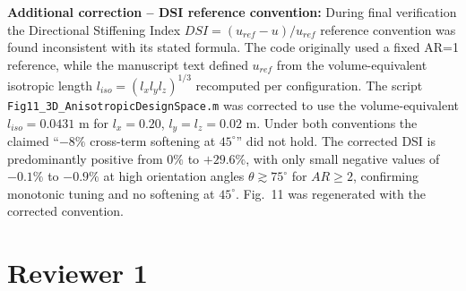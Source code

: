 \documentclass[12pt,a4paper]{article}
\begin{document}
\textbf{Additional correction -- DSI reference convention:} During final verification the Directional Stiffening Index $DSI=(u_{ref}-u)/u_{ref}$ reference convention was found inconsistent with its stated formula. The code originally used a fixed AR=1 reference, while the manuscript text defined $u_{ref}$ from the volume-equivalent isotropic length $l_{iso}=(l_x l_y l_z)^{1/3}$ recomputed per configuration. The script \texttt{Fig11\_3D\_AnisotropicDesignSpace.m} was corrected to use the volume-equivalent $l_{iso}=0.0431$ m for $l_x=0.20$, $l_y=l_z=0.02$ m. Under both conventions the claimed ``$-8\%$ cross-term softening at $45^\circ$'' did not hold. The corrected DSI is predominantly positive from $0\%$ to $+29.6\%$, with only small negative values of $-0.1\%$ to $-0.9\%$ at high orientation angles $\theta\gtrsim75^\circ$ for $AR\ge2$, confirming monotonic tuning and no softening at $45^\circ$. Fig.~11 was regenerated with the corrected convention.

\section*{Reviewer 1}
\end{document}
